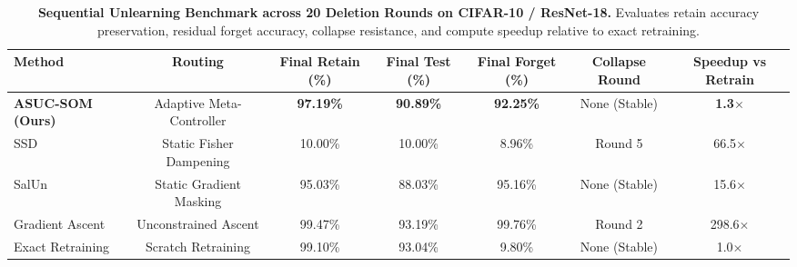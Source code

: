 \begin{table}[t]
\centering
\small
\caption{\textbf{Sequential Unlearning Benchmark across 20 Deletion Rounds on CIFAR-10 / ResNet-18.} Evaluates retain accuracy preservation, residual forget accuracy, collapse resistance, and compute speedup relative to exact retraining.}
\label{tab:sequential_unlearning}
\begin{tabular}{lcccccc}
\toprule
\textbf{Method} & \textbf{Routing} & \textbf{Final Retain (\%)} & \textbf{Final Test (\%)} & \textbf{Final Forget (\%)} & \textbf{Collapse Round} & \textbf{Speedup vs Retrain} \\
\midrule
\textbf{\textbf{ASUC-SOM (Ours)}} & Adaptive Meta-Controller & \textbf{97.19\%} & \textbf{90.89\%} & \textbf{92.25\%} & None (Stable) & \textbf{1.3$\times$} \\
SSD & Static Fisher Dampening & 10.00\% & 10.00\% & 8.96\% & Round 5 & 66.5$\times$ \\
SalUn & Static Gradient Masking & 95.03\% & 88.03\% & 95.16\% & None (Stable) & 15.6$\times$ \\
Gradient Ascent & Unconstrained Ascent & 99.47\% & 93.19\% & 99.76\% & Round 2 & 298.6$\times$ \\
Exact Retraining & Scratch Retraining & 99.10\% & 93.04\% & 9.80\% & None (Stable) & 1.0$\times$ \\
\bottomrule
\end{tabular}
\end{table}
